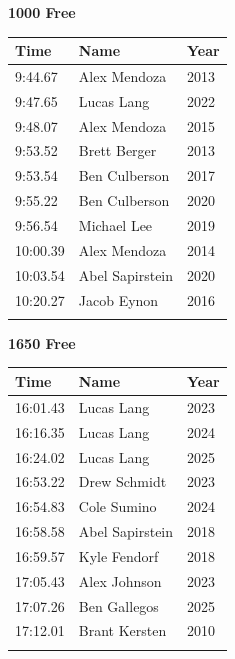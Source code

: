 \vspace{1.2em}
\noindent\begin{minipage}[t]{0.48\textwidth}
\centering
\textbf{\textcolor{teamprimary}{1000 Free}}\par
\vspace{0.5em}
\centering
\small
\renewcommand{\arraystretch}{1.0}
\setlength{\tabcolsep}{4pt}
\begin{tabular}{@{}p{1.8cm}p{3.0cm}p{1.0cm}@{}}
\toprule
\textbf{Time} & \textbf{Name} & \textbf{Year} \\
\midrule
9:44.67 & Alex Mendoza & 2013 \\
9:47.65 & Lucas Lang & 2022 \\
9:48.07 & Alex Mendoza & 2015 \\
9:53.52 & Brett Berger & 2013 \\
9:53.54 & Ben Culberson & 2017 \\
9:55.22 & Ben Culberson & 2020 \\
9:56.54 & Michael Lee & 2019 \\
10:00.39 & Alex Mendoza & 2014 \\
10:03.54 & Abel Sapirstein & 2020 \\
10:20.27 & Jacob Eynon & 2016 \\
\bottomrule
\vspace{0.5em}
\end{tabular}
\end{minipage}
\hfill
\begin{minipage}[t]{0.48\textwidth}
\centering
\textbf{\textcolor{teamprimary}{1650 Free}}\par
\vspace{0.5em}
\centering
\small
\renewcommand{\arraystretch}{1.0}
\setlength{\tabcolsep}{4pt}
\begin{tabular}{@{}p{1.8cm}p{3.0cm}p{1.0cm}@{}}
\toprule
\textbf{Time} & \textbf{Name} & \textbf{Year} \\
\midrule
16:01.43 & Lucas Lang & 2023 \\
16:16.35 & Lucas Lang & 2024 \\
16:24.02 & Lucas Lang & 2025 \\
16:53.22 & Drew Schmidt & 2023 \\
16:54.83 & Cole Sumino & 2024 \\
16:58.58 & Abel Sapirstein & 2018 \\
16:59.57 & Kyle Fendorf & 2018 \\
17:05.43 & Alex Johnson & 2023 \\
17:07.26 & Ben Gallegos & 2025 \\
17:12.01 & Brant Kersten & 2010 \\
\bottomrule
\vspace{0.5em}
\end{tabular}
\end{minipage}
